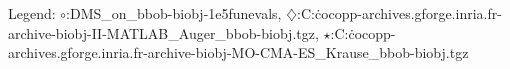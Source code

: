 Legend: {\color{NavyBlue}$\circ$}:DMS\_on\_bbob-biobj-1e5funevals, {\color{Magenta}$\diamondsuit$}:C:\Users\dimo\.cocopp\data-archives\coco.gforge.inria.fr\data-archive\bbob-biobj\NSGA-II-MATLAB\_Auger\_bbob-biobj.tgz, {\color{Orange}$\star$}:C:\Users\dimo\.cocopp\data-archives\coco.gforge.inria.fr\data-archive\bbob-biobj\UP-MO-CMA-ES\_Krause\_bbob-biobj.tgz